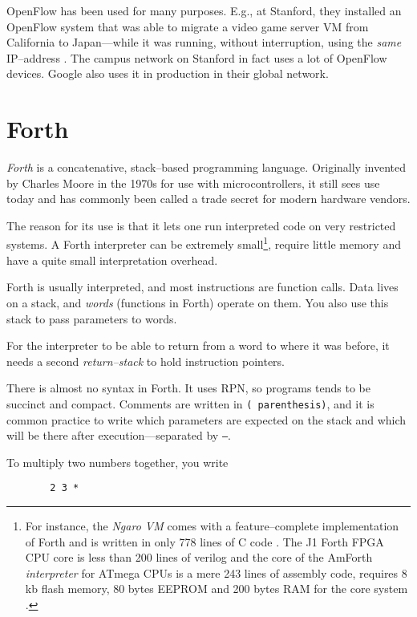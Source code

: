 OpenFlow has been used for many purposes.  E.g., at Stanford, they installed
an OpenFlow system that was able to migrate a video game server \ac{VM} from
California to Japan---while it was running, without interruption, using the
\textit{same} IP--address \cite{erickson2008demonstration}
\cite{kobayashi2013maturing}.
The campus network on Stanford in fact uses a lot of OpenFlow devices.
Google also uses it in production in their global network.

\section{Forth}

\textit{Forth} is a concatenative, stack--based programming language.
Originally invented by Charles Moore in the 1970s for use with
microcontrollers, it still sees use today and has commonly been called a
trade secret for modern hardware vendors.

The reason for its use is that it lets one run interpreted code on very
restricted systems. A Forth interpreter can be extremely small\footnote{For
instance, the \textit{Ngaro \ac{VM}} comes with a feature--complete
implementation of Forth and is written in only 778 lines of C code
\cite{ngaro.vm.core}.  The J1 Forth FPGA CPU core is less than 200 lines of verilog
\cite{bowman2010j1} and the core of the AmForth \textit{interpreter} for
ATmega CPUs is a mere 243 lines of assembly code, requires 8 kb flash
memory, 80 bytes EEPROM and 200 bytes RAM for the core system
\cite{amforth}.}, require little memory and have a quite small
interpretation overhead.

Forth is usually interpreted, and most instructions are function calls.
Data lives on a stack, and \textit{words} (functions in Forth) operate on them.
You also use this stack to pass parameters to words.

For the interpreter to be able to return from a word to where it was before,
it needs a second \textit{return--stack} to hold instruction pointers.

There is almost no syntax in Forth.  It uses \ac{RPN}, so programs tends to
be succinct and compact.  Comments are written in \texttt{( parenthesis)},
and it is common practice to write which parameters are expected on the
stack and which will be there after execution---separated by \texttt{--}.

To multiply two numbers together, you write

\begin{figure}[H]
  \centering
  \begin{Verbatim}
  2 3 *
  \end{Verbatim}
\end{figure}

